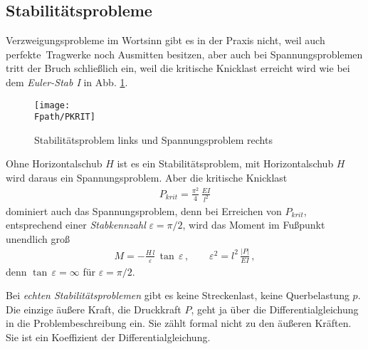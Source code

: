{\textcolor{sectionTitleBlue}{\section{Stabilit\"{a}tsprobleme}}}
Verzweigungsprobleme im Wortsinn gibt es in der Praxis nicht, weil auch \glq perfekte\grq\ Tragwerke
noch Ausmitten besitzen, aber auch bei Spannungsproblemen tritt der Bruch schlie{\ss}lich
ein, weil die kritische Knicklast erreicht wird wie bei dem {\em Euler-Stab
I} in Abb. \ref{Pkrit}.
\begin{figure}[tbp] \centering
\if {} \sidecaption \fi
\texttt{[image: \\Fpath/PKRIT]}
\caption{Stabilit\"{a}tsproblem links und Spannungsproblem rechts}
\label{Pkrit}%
\end{figure}%
Ohne Horizontalschub $H$ ist es ein Stabilit\"{a}tsproblem, mit Horizontalschub $H$ wird
daraus ein Spannungsproblem. Aber die kritische Knicklast
\begin{align}
P_{krit} = \frac{\pi^2}{4}\,\frac{EI}{l^2}
\end{align}
dominiert auch das Spannungsproblem, denn bei Erreichen von $P_{krit}$, entsprechend
einer {\em Stabkennzahl} $ \varepsilon = \pi/2$, wird das Moment im
Fu{\ss}punkt unendlich gro{\ss}
\begin{align}
M = - \frac{H\,l}{\varepsilon} \,\tan \,\varepsilon\,, \qquad \varepsilon^2 = l^2
\,\frac{|P|}{EI}\,,
\end{align}
denn $\tan\,\varepsilon = \infty$ f\"{u}r $\varepsilon = \pi/2$.

Bei {\em echten Stabilit\"{a}tsproblemen} gibt es keine Streckenlast, keine Querbelastung
$p$. Die einzige \"{a}u{\ss}ere Kraft, die Druckkraft $P$, geht ja \"{u}ber die Differentialgleichung
in die Problembeschreibung ein. Sie z\"{a}hlt formal nicht zu den \"{a}u{\ss}eren Kr\"{a}ften. Sie ist ein Koeffizient der Differentialgleichung.

